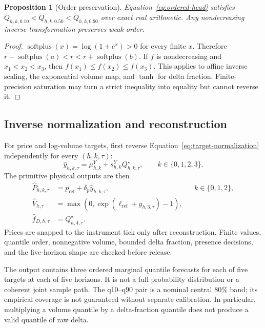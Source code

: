 \documentclass[10pt,letterpaper]{article}
\numberwithin{equation}{section}
\newcommand{\softplus}{\operatorname{softplus}}
\newtheorem{proposition}{Proposition}
\theoremstyle{definition}
\theoremstyle{remark}
\begin{document}
\begin{proposition}[Order preservation]
Equation~\eqref{eq:ordered-head} satisfies
$\widetilde Q_{h,k,0.10}<\widetilde Q_{h,k,0.50}<
\widetilde Q_{h,k,0.90}$ over exact real
arithmetic. Any nondecreasing inverse transformation preserves weak order.
\end{proposition}
\begin{proof}
$\softplus(x)=\log(1+e^x)>0$ for every finite $x$. Therefore
$r-\softplus(a)<r<r+\softplus(b)$. If $f$ is nondecreasing and
$x_1<x_2<x_3$, then $f(x_1)\le f(x_2)\le f(x_3)$. This applies to affine
inverse scaling, the exponential volume map, and $\tanh$ for delta fraction.
Finite-precision saturation may turn a strict inequality into equality but
cannot reverse it.
\end{proof}

\subsection{Inverse normalization and reconstruction}

For price and log-volume targets, first reverse
Equation~\eqref{eq:target-normalization} independently for every $(h,k,\tau)$:
\begin{equation}
\widehat y_{h,k,\tau}=\mu^Y_{h,k}
+s^Y_{h,k}Q^\star_{h,k,\tau},\qquad k\in\{0,1,2,3\}.
\label{eq:inverse-target-scale}
\end{equation}
The primitive physical outputs are then
\begin{align}
\widehat P_{h,k,\tau}&=p_{\mathrm{ref}}
+\delta_p\widehat y_{h,k,\tau}, && k\in\{0,1,2\},\nonumber\\
\widehat V_{h,\tau}&=\max\!\left(0,
\exp(\ell_{\mathrm{ref}}+\widehat y_{h,3,\tau})-1\right),\nonumber\\
\widehat f_{D,h,\tau}&=Q^\star_{h,4,\tau}.
\label{eq:physical-reconstruction}
\end{align}
Prices are snapped to the instrument tick only after reconstruction. Finite
values, quantile order, nonnegative volume, bounded delta fraction, presence
decisions, and the five-horizon shape are checked before release.

The output contains three ordered marginal quantile forecasts for each of five
targets at each of five horizons. It is not a full probability distribution or
a coherent joint sample path. The q10--q90 pair is a nominal central 80\% band;
its empirical coverage is not guaranteed without separate calibration. In
particular, multiplying a volume quantile by a delta-fraction quantile does not
produce a valid quantile of raw delta.
\end{document}
